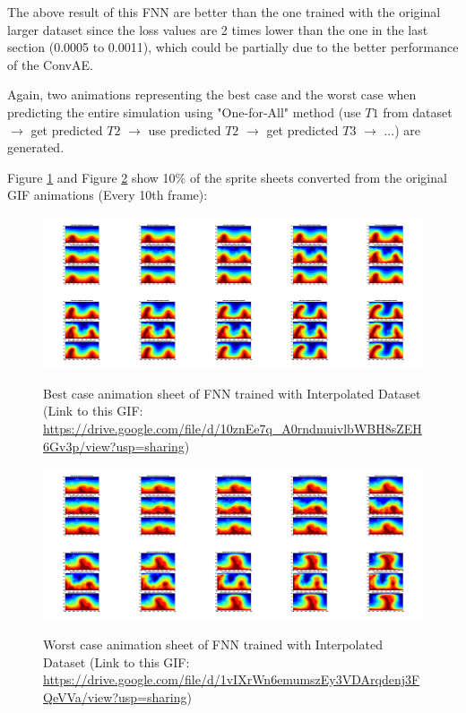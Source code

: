 The above result of this FNN are better than the one trained with the original larger dataset since the loss values are 2 times lower than the one in the last section (0.0005 to 0.0011), which could be partially due to the better performance of the ConvAE.

Again, two animations representing the best case and the worst case when predicting the entire simulation using "One-for-All" method (use $T1$ from dataset $\rightarrow$ get predicted $T2$ $\rightarrow$ use predicted $T2$ $\rightarrow$ get predicted $T3$ $\rightarrow$ ...) are generated.

Figure \ref{figure:FNN_interpolated_best_gif} and Figure \ref{figure:FNN_interpolated_worst_gif} show 10\% of the sprite sheets converted from the original GIF animations (Every 10th frame):

\begin{figure}[H]
    \centering
    \caption{Best case animation sheet of FNN trained with Interpolated Dataset (Link to this GIF: \url{https://drive.google.com/file/d/10znEe7q_A0rndmuivlbWBH8sZEH6Gv3p/view?usp=sharing})}
    \includegraphics[scale=0.10]{figures/mantle_convection_images/larger_dataset_interpolated/FNN_Best_GIF_sheet.png}
    \label{figure:FNN_interpolated_best_gif}
\end{figure}

\begin{figure}[H]
    \centering
    \caption{Worst case animation sheet of FNN trained with Interpolated Dataset (Link to this GIF: 
    \url{https://drive.google.com/file/d/1vIXrWn6emumszEy3VDArqdenj3FQeVVa/view?usp=sharing})}
    \includegraphics[scale=0.10]{figures/mantle_convection_images/larger_dataset_interpolated/FNN_Worst_GIF_sheet.png}
    \label{figure:FNN_interpolated_worst_gif}
\end{figure}

